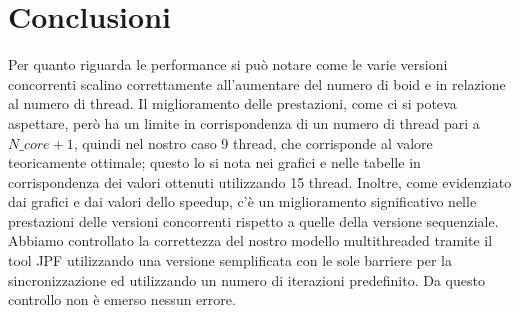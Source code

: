 \documentclass[a4paper,12pt]{report}
\begin{document}


\chapter{Conclusioni}
Per quanto riguarda le performance si può notare come le varie versioni concorrenti scalino correttamente all'aumentare del numero di boid e in relazione al numero di thread. Il miglioramento delle prestazioni, come ci si poteva aspettare, però ha un limite in corrispondenza di un numero di thread pari a $N\_core + 1$, quindi nel nostro caso 9 thread, che corrisponde al valore teoricamente ottimale; questo lo si nota nei grafici e nelle tabelle in corrispondenza dei valori ottenuti utilizzando 15 thread. Inoltre, come evidenziato dai grafici e dai valori dello speedup, c'è un miglioramento significativo nelle prestazioni delle versioni concorrenti rispetto a quelle della versione sequenziale.\\
Abbiamo controllato la correttezza del nostro modello multithreaded tramite il tool JPF utilizzando una versione semplificata con le sole barriere per la sincronizzazione ed utilizzando un numero di iterazioni predefinito. Da questo controllo non è emerso nessun errore.
\end{document}
